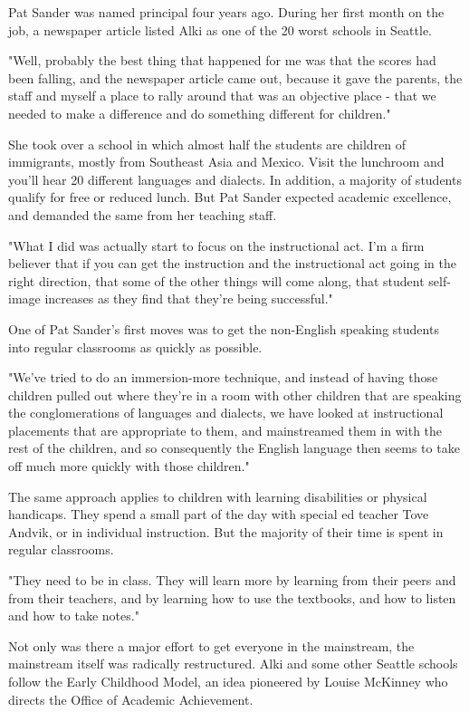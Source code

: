 Pat Sander was named principal four years ago. During her first month on the job, a newspaper article listed Alki as one of the 20 worst schools in Seattle.

"Well, probably the best thing that happened for me was that the scores had been falling, and the newspaper article came out, because it gave the parents, the staff and myself a place to rally around that was an objective place - that we needed to make a difference and do something different for children."

She took over a school in which almost half the students are children of immigrants, mostly from Southeast Asia and Mexico. Visit the lunchroom and you'll hear 20 different languages and dialects. In addition, a majority of students qualify for free or reduced lunch. But Pat Sander expected academic excellence, and demanded the same from her teaching staff.

"What I did was actually start to focus on the instructional act. I'm a firm believer that if you can get the instruction and the instructional act going in the right direction, that some of the other things will come along, that student self-image increases as they find that they're being successful."

One of Pat Sander's first moves was to get the non-English speaking students into regular classrooms as quickly as possible.

"We've tried to do an immersion-more technique, and instead of having those children pulled out where they're in a room with other children that are speaking the conglomerations of languages and dialects, we have looked at instructional placements that are appropriate to them, and mainstreamed them in with the rest of the children, and so consequently the English language then seems to take off much more quickly with those children."

The same approach applies to children with learning disabilities or physical handicaps. They spend a small part of the day with special ed teacher Tove Andvik, or in individual instruction. But the majority of their time is spent in regular classrooms.

"They need to be in class. They will learn more by learning from their peers and from their teachers, and by learning how to use the textbooks, and how to listen and how to take notes."

Not only was there a major effort to get everyone in the mainstream, the mainstream itself was radically restructured. Alki and some other Seattle schools follow the Early Childhood Model, an idea pioneered by Louise McKinney who directs the Office of Academic Achievement.

